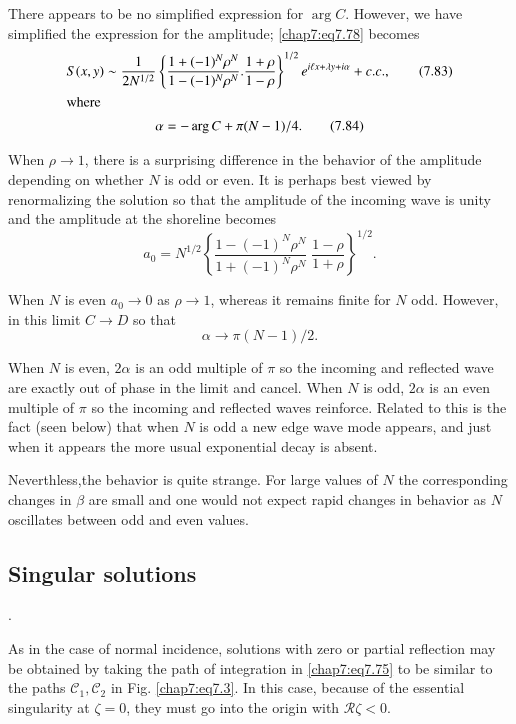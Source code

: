 {{There appears to be no simplified expression for $\arg C$. However, we have simplified the expression for the amplitude; \eqref{chap7:eq7.78} becomes 
\begin{gather}
S(x,y)\sim\frac{1}{2N^{1/2}}\left\{\frac{1+(-1)^N\rho^N}{1-(-1)^N\rho^N}. \frac{1+\rho}{1-\rho}\right\}^{1/2} e^{i\ell x+\lambda y+i\alpha}+c.c., \tag{7.83}\label{chap7:eq7.83}\\
\intertext{where}
\alpha = - \arg C+\pi(N-1)/4.\tag{7.84}\label{chap7:eq7.84}
\end{gather}

When $\rho\to 1$, there is a surprising difference in the behavior of the amplitude depending on whether $N$ is odd or even. It is perhaps best viewed by renormalizing the solution so that the amplitude of the incoming wave is unity and the amplitude at the shoreline becomes
\begin{equation}
a_0=N^{1/2}\left\{\frac{1-(-1)^N\rho^N}{1+(-1)^N\rho^N}\;\frac{1-\rho}{1+\rho} \right\}^{1/2}.\tag{7.85}\label{chap7:eq7.85}
\end{equation}

When $N$ is even $a_0\to 0$ as $\rho\to 1$, whereas it remains finite for $N$ odd. However, in this limit $C\to D$ so that 
$$
\alpha\to\pi(N-1)/2.
$$

When $N$ is even, $2\alpha$ is an odd multiple of $\pi$ so the incoming and reflected wave are exactly out of phase in the limit and cancel. When $N$ is odd, $2\alpha$ is an even multiple of $\pi$ so the incoming and reflected waves reinforce. Related to this is the fact (seen below) that when $N$ is odd a new edge wave mode appears, and just when it appears the more usual exponential decay is absent.

Neverthless,\pageoriginale the behavior is quite strange. For large values of $N$ the corresponding changes in $\beta$ are small and one would not expect rapid changes in behavior as $N$ oscillates between odd and even values.

\subsection*{\bf Singular solutions}.

As in the case of normal incidence, solutions with zero or partial reflection may be obtained by taking the path of integration in \eqref{chap7:eq7.75} to be similar to the paths $\mathscr{C}_1, \mathscr{C}_2$ in Fig. \eqref{chap7:eq7.3}. In this case, because of the essential singularity at $\zeta =0$, they must go into the origin with $\mathscr{R}\zeta <0$. 

}}
